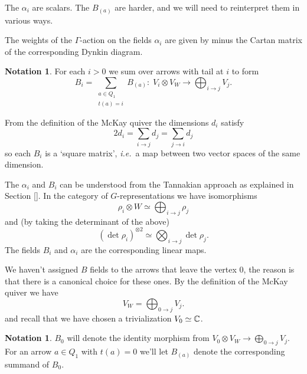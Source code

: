 \documentclass{amsart}
\theoremstyle{definition}
\newtheorem{notn}[theorem]{Notation}
\newcommand\pgap{\vspace{10pt}}
\newcommand\VW{V_W}
\begin{document}
The $\alpha_i$ are scalars. The $B_{(a)}$ are harder, and we will need to reinterpret them in various ways.

\begin{remark}\label{rm:cartan}
The weights of the $\Gamma$-action on the fields $\alpha_i$ are given by minus the Cartan matrix of the corresponding Dynkin diagram.
\end{remark}

\begin{notn} For each $i>0$ we sum over arrows with tail at $i$ to form
$$B_i = \sum_{\substack{a\in Q_1\\ t(a)=i}} B_{(a)}:\; V_i\otimes\VW \longrightarrow\bigoplus_{i\to j} V_j. $$
\end{notn}

From the definition of the McKay quiver the dimensions $d_i$ satisfy
\begin{equation}\label{eq:drelation} 2d_i = \sum_{i\rightarrow j} d_j = \sum_{j\rightarrow i} d_j \end{equation}
so each $B_i$ is a `square matrix', \emph{i.e.}~a map between two vector spaces of the same dimension. 


\begin{remark}\label{rm:Tannaka}
The $\alpha_i$ and $B_i$ can be understood from the Tannakian approach as explained in Section \ref{}.  In the category of $G$-representations we have isomorphisms
$$\rho_i\otimes W \simeq \bigoplus_{i\to j} \rho_j$$
and (by taking the determinant of the above)
$$ (\det \rho_i)^{\otimes 2} \simeq \bigotimes_{i\to j} \det \rho_j. $$
The fields $B_i$ and $\alpha_i$ are the corresponding linear maps.
\end{remark}



We haven't assigned $B$ fields to the arrows that leave the vertex 0, the reason is that there is a canonical choice for these ones. By the definition of the McKay quiver we have
\begin{equation}\label{eq:from0} \VW = \bigoplus_{0\to j} V_j. \end{equation}
and recall that we have chosen a trivialization $V_0\simeq \mathbb{C}$. 

\begin{notn}
 $B_0$ will denote the identity morphism from $V_0\otimes V_W \longrightarrow\bigoplus_{0\to j} V_j$. For an arrow $a\in Q_1$ with $t(a)=0$ we'll let $B_{(a)}$ denote the corresponding summand of $B_0$.
\end{notn}
\end{document}
